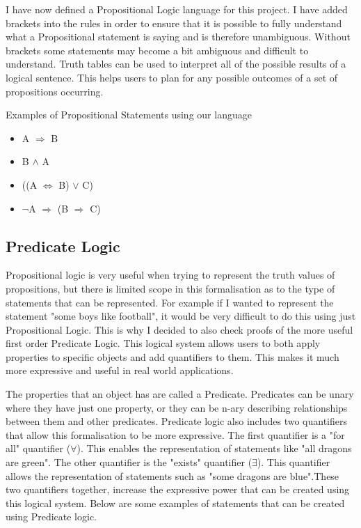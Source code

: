 I have now defined a Propositional Logic language for this project. I have added brackets into the rules in order to ensure that it is possible to fully understand what a Propositional statement is saying and is therefore unambiguous. Without brackets some statements may become a bit ambiguous and difficult to understand. Truth tables can be used to interpret all of the possible results of a logical sentence. This helps users to plan for any possible outcomes of a set of propositions occurring.

\pagebreak
\begin{exmp}Examples of Propositional Statements using our language
\begin{itemize}
\item A $\Rightarrow$ B
\item B $\wedge$ A
\item ((A $\Leftrightarrow$ B) $\vee$ C)
\item $\neg$A $\Rightarrow$ (B $\Rightarrow$ C)
\end{itemize}
\end{exmp}


\subsection{Predicate Logic \label{predicate}}
Propositional logic is very useful when trying to represent the truth values of propositions, but there is limited scope in this formalisation as to the type of statements that can be represented. For example if I wanted to represent the statement "some boys like football", it would be very difficult to do this using just Propositional Logic. This is why I decided to also check proofs of the more useful first order Predicate Logic. This logical system allows users to both apply properties to specific objects and add quantifiers to them. This makes it much more expressive and useful in real world applications. 

The properties that an object has are called a Predicate. Predicates can be unary where they have just one property, or they can be n-ary describing relationships between them and other predicates. Predicate logic also includes two quantifiers that allow this formalisation to be more expressive. The first quantifier is a "for all" quantifier ($\forall$). This enables the representation of statements like "all dragons are green". The other quantifier is the "exists" quantifier ($\exists$). This quantifier allows the representation of statements such as "some dragons are blue".These two quantifiers together, increase the expressive power that can be created using this logical system. Below are some examples of statements that can be created using Predicate logic.

